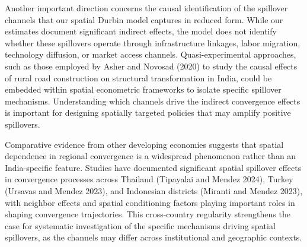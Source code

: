 \documentclass[
  letterpaper,
  DIV=11,
  numbers=noendperiod]{scrartcl}
\begin{document}
Another important direction concerns the causal identification of the
spillover channels that our spatial Durbin model captures in reduced
form. While our estimates document significant indirect effects, the
model does not identify whether these spillovers operate through
infrastructure linkages, labor migration, technology diffusion, or
market access channels. Quasi-experimental approaches, such as those
employed by Asher and Novosad (2020) to study the causal effects of
rural road construction on structural transformation in India, could be
embedded within spatial econometric frameworks to isolate specific
spillover mechanisms. Understanding which channels drive the indirect
convergence effects is important for designing spatially targeted
policies that may amplify positive spillovers.

Comparative evidence from other developing economies suggests that
spatial dependence in regional convergence is a widespread phenomenon
rather than an India-specific feature. Studies have documented
significant spatial spillover effects in convergence processes across
Thailand (Tipayalai and Mendez 2024), Turkey (Ursavas and Mendez 2023),
and Indonesian districts (Miranti and Mendez 2023), with neighbor
effects and spatial conditioning factors playing important roles in
shaping convergence trajectories. This cross-country regularity
strengthens the case for systematic investigation of the specific
mechanisms driving spatial spillovers, as the channels may differ across
institutional and geographic contexts.
\end{document}
